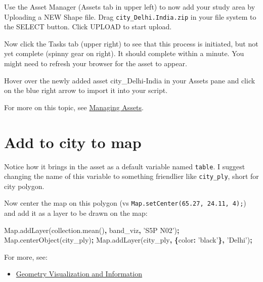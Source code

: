 \documentclass[]{book}
\newenvironment{Shaded}{\begin{snugshade}}{\end{snugshade}}
\newcommand{\AttributeTok}[1]{\textcolor[rgb]{0.77,0.63,0.00}{#1}}
\newcommand{\DataTypeTok}[1]{\textcolor[rgb]{0.13,0.29,0.53}{#1}}
\newcommand{\NormalTok}[1]{#1}
\newcommand{\OperatorTok}[1]{\textcolor[rgb]{0.81,0.36,0.00}{\textbf{#1}}}
\newcommand{\StringTok}[1]{\textcolor[rgb]{0.31,0.60,0.02}{#1}}
\newcommand{\VariableTok}[1]{\textcolor[rgb]{0.00,0.00,0.00}{#1}}
\providecommand{\tightlist}{%
  \setlength{\itemsep}{0pt}\setlength{\parskip}{0pt}}
\begin{document}
Use the Asset Manager (Assets tab in upper left) to now add your study area by Uploading a {NEW} Shape file. Drag \texttt{city\_Delhi.India.zip} in your file system to the {SELECT} button. Click {UPLOAD} to start upload.

Now click the Tasks tab (upper right) to see that this process is initiated, but not yet complete (spinny gear on right). It should complete within a minute. You might need to refresh your browser for the asset to appear.

Hover over the newly added asset city\_Delhi-India in your Assets pane and click on the blue right arrow to import it into your script.

For more on this topic, see \href{https://developers.google.com/earth-engine/asset_manager}{Managing Assets}.

\hypertarget{add-to-city-to-map}{%
\section{Add to city to map}\label{add-to-city-to-map}}

Notice how it brings in the asset as a default variable named \texttt{table}. I suggest changing the name of this variable to something friendlier like \texttt{city\_ply}, short for city polygon.

Now center the map on this polygon (vs \texttt{Map.setCenter(65.27,\ 24.11,\ 4);}) and add it as a layer to be drawn on the map:

\begin{Shaded}
\begin{Highlighting}[]
\VariableTok{Map}\NormalTok{.}\AttributeTok{addLayer}\NormalTok{(}\VariableTok{collection}\NormalTok{.}\AttributeTok{mean}\NormalTok{()}\OperatorTok{,}\NormalTok{ band_viz}\OperatorTok{,} \StringTok{'S5P N02'}\NormalTok{)}\OperatorTok{;}
\VariableTok{Map}\NormalTok{.}\AttributeTok{centerObject}\NormalTok{(city_ply)}\OperatorTok{;}
\VariableTok{Map}\NormalTok{.}\AttributeTok{addLayer}\NormalTok{(city_ply}\OperatorTok{,} \OperatorTok{\{}\DataTypeTok{color}\OperatorTok{:} \StringTok{'black'}\OperatorTok{\},} \StringTok{'Delhi'}\NormalTok{)}\OperatorTok{;}
\end{Highlighting}
\end{Shaded}

For more, see:

\begin{itemize}
\tightlist
\item
  \href{https://developers.google.com/earth-engine/geometry_visualization_info}{Geometry Visualization and Information}
\end{itemize}
\end{document}
